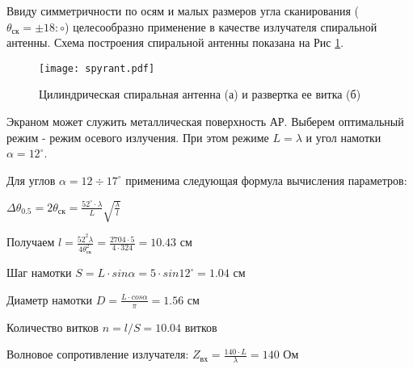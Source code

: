 Ввиду симметричности по осям и малых размеров угла сканирования ($\theta_\text{ск}=\pm18:\circ$) целесообразно применение в качестве излучателя спиральной антенны. Схема построения спиральной антенны показана на Рис \ref{fig:spyrant}. 

\begin{figure}[H]
	\centering
	\texttt{[image: spyrant.pdf]}
	\caption{Цилиндрическая спиральная антенна (а) и развертка ее витка (б)}
	\label{fig:spyrant}
\end{figure}

Экраном может служить металлическая поверхность АР. Выберем оптимальный режим - режим осевого излучения. При этом режиме $L=\lambda$ и угол намотки $\alpha=12^\circ$.

Для углов $\alpha=12\div17^\circ$ применима следующая формула вычисления параметров:

$\displaystyle \Delta\theta_{0.5}=2\theta_\text{ск}=\frac{52^\circ\cdot\lambda}{L}\sqrt{\frac{\lambda}{l}}$

Получаем $\displaystyle l=\frac{52^2\lambda}{4\theta^2_\text{ск}}=\frac{2704\cdot5}{4\cdot324}=10.43 \text{ см}$

Шаг намотки $\displaystyle S=L\cdot sin\alpha=5\cdot sin12^\circ=1.04 \text{ см}$

Диаметр намотки $\displaystyle D=\frac{L\cdot cos\alpha}{\pi}=1.56 \text{ см}$

Количество витков $\displaystyle n=l/S=10.04 \text{ витков}$

Волновое сопротивление излучателя: $\displaystyle Z_\text{вх}=\frac{140\cdot L}{\lambda}=140 \text{ Ом}$

